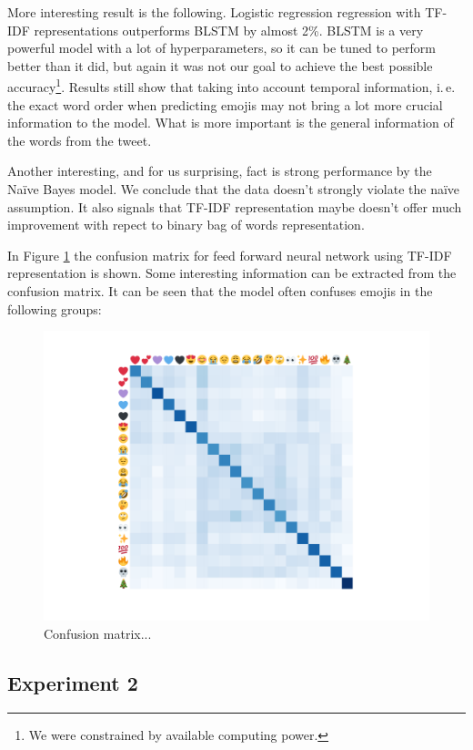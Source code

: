 \documentclass[10pt, a4paper]{article}
\begin{document}
More interesting result is the following. Logistic regression regression with 
TF-IDF representations outperforms BLSTM by almost 2\%. BLSTM is a very powerful
model with a lot of hyperparameters, so it can be tuned to perform better than 
it did, but again it was not our goal to achieve the best possible 
accuracy\footnote{We were constrained by available computing power.}.
Results still show that taking into account temporal information, i.\,e. the 
exact word order when predicting emojis may not bring a lot more crucial 
information to the model. What is more important is the general information of 
the words from the tweet.

Another interesting, and for us surprising, fact is strong performance by the 
Na\"ive Bayes model. We conclude that the data doesn't strongly violate the 
na\"ive assumption. It also signals that TF-IDF representation maybe doesn't 
offer much improvement with repect to binary bag of words representation.

In Figure \ref{fig:confusion_matrix} the confusion matrix for feed forward 
neural network using TF-IDF representation is shown. Some interesting 
information can be extracted from the confusion matrix. It can be seen that the
model often confuses emojis in the following groups: 

    
\begin{figure}
\begin{center}
\includegraphics[width=0.8\columnwidth]{img/confusion_matrix.pdf}
\caption{Confusion matrix...}
\label{fig:confusion_matrix}
\end{center}
\end{figure}

\subsection{Experiment 2}
\end{document}
